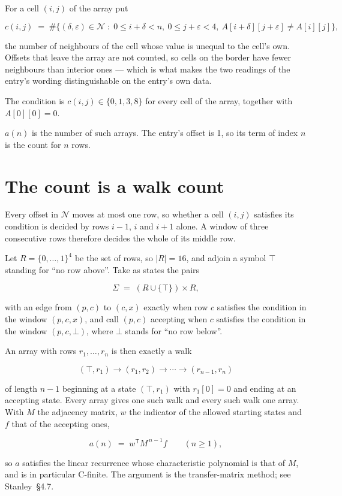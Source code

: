 \documentclass[11pt]{article}
\theoremstyle{definition}
\begin{document}
For a cell $(i,j)$ of the array put

\[c(i,j) \;=\; \#\bigl\{(\delta,\varepsilon)\in\mathcal{N} \;:\; 0\le i+\delta<n,\ 0\le j+\varepsilon<4,\ A[i+\delta][j+\varepsilon] \neq A[i][j]\bigr\},\]

the number of neighbours of the cell whose value is unequal to the cell's own. Offsets that leave the array are not counted, so cells on the border have fewer neighbours than interior ones --- which is what makes the two readings of the entry's wording distinguishable on the entry's own data.

The condition is $c(i,j) \in \{0, 1, 3, 8\}$ for every cell of the array, together with $A[0][0]=0$.

$a(n)$ is the number of such arrays. The entry's offset is 1, so its term of index $n$ is the count for $n$ rows.

\section{The count is a walk count}

Every offset in $\mathcal{N}$ moves at most one row, so whether a cell $(i,j)$ satisfies its condition is decided by rows $i-1$, $i$ and $i+1$ alone. A window of three consecutive rows therefore decides the whole of its middle row.

Let $R = \{0,\dots,1\}^{4}$ be the set of rows, so $|R| = 16$, and adjoin a symbol $\top$ standing for ``no row above''. Take as states the pairs

\[\Sigma \;=\; (R \cup \{\top\}) \times R,\]

with an edge from $(p,c)$ to $(c,x)$ exactly when row $c$ satisfies the condition in the window $(p,c,x)$, and call $(p,c)$ accepting when $c$ satisfies the condition in the window $(p,c,\bot)$, where $\bot$ stands for ``no row below''.

An array with rows $r_1,\dots,r_n$ is then exactly a walk

\[(\top,r_1) \to (r_1,r_2) \to \cdots \to (r_{n-1},r_n)\]

of length $n-1$ beginning at a state $(\top,r_1)$ with $r_1[0]=0$ and ending at an accepting state. Every array gives one such walk and every such walk one array. With $M$ the adjacency matrix, $w$ the indicator of the allowed starting states and $f$ that of the accepting ones,

\[a(n) \;=\; w^{\mathsf T} M^{\,n-1} f \qquad (n \ge 1),\]

so $a$ satisfies the linear recurrence whose characteristic polynomial is that of $M$, and is in particular C-finite. The argument is the transfer-matrix method; see Stanley~\S4.7.
\end{document}
